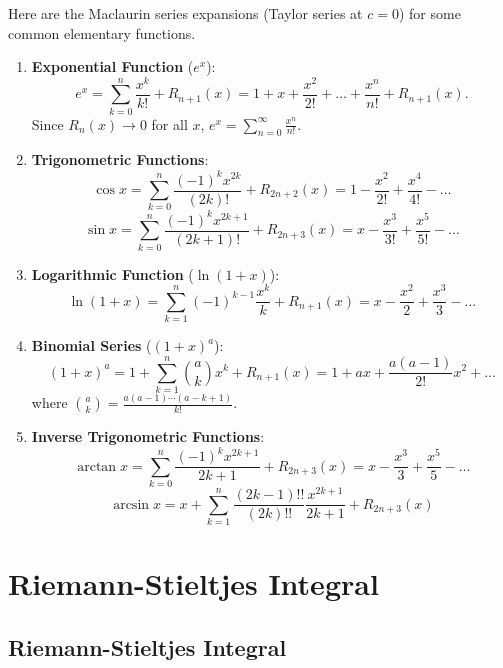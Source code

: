 \documentclass[
	UTF-8,
	11pt, %
	a4paper, %
]{LegrandOrangeBook}
\begin{document}
    Here are the Maclaurin series expansions (Taylor series at $c=0$) for some common elementary functions.

    \begin{example}\quad
    \begin{enumerate}
        \item \textbf{Exponential Function} ($e^x$):
        \[ e^x = \sum_{k=0}^n \frac{x^k}{k!} + R_{n+1}(x) = 1 + x + \frac{x^2}{2!} + \dots + \frac{x^n}{n!} + R_{n+1}(x). \]
        Since $R_n(x) \to 0$ for all $x$, $e^x = \sum_{n=0}^\infty \frac{x^n}{n!}$.

        \item \textbf{Trigonometric Functions}:
        \[ \cos x = \sum_{k=0}^n \frac{(-1)^k x^{2k}}{(2k)!} + R_{2n+2}(x) = 1 - \frac{x^2}{2!} + \frac{x^4}{4!} - \dots \]
        \[ \sin x = \sum_{k=0}^n \frac{(-1)^k x^{2k+1}}{(2k+1)!} + R_{2n+3}(x) = x - \frac{x^3}{3!} + \frac{x^5}{5!} - \dots \]
        
        \item \textbf{Logarithmic Function} ($\ln(1+x)$):
        \[ \ln(1+x) = \sum_{k=1}^n (-1)^{k-1} \frac{x^k}{k} + R_{n+1}(x) = x - \frac{x^2}{2} + \frac{x^3}{3} - \dots \]
        
        \item \textbf{Binomial Series} ($(1+x)^a$):
        \[ (1+x)^a = 1 + \sum_{k=1}^n \binom{a}{k} x^k + R_{n+1}(x) = 1 + ax + \frac{a(a-1)}{2!}x^2 + \dots \]
        where $\binom{a}{k} = \frac{a(a-1)\cdots(a-k+1)}{k!}$.

        \item \textbf{Inverse Trigonometric Functions}:
        \[ \arctan x = \sum_{k=0}^n \frac{(-1)^k x^{2k+1}}{2k+1} + R_{2n+3}(x) = x - \frac{x^3}{3} + \frac{x^5}{5} - \dots \]
        \[ \arcsin x = x + \sum_{k=1}^n \frac{(2k-1)!!}{(2k)!!} \frac{x^{2k+1}}{2k+1} + R_{2n+3}(x) \]
    \end{enumerate}
    \end{example}

    \newpage

    \chapter{Riemann-Stieltjes Integral}

    \section{Riemann-Stieltjes Integral}
\end{document}
